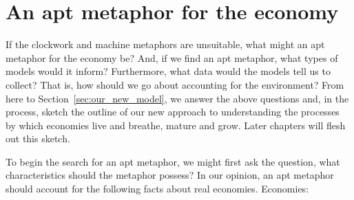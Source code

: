 \section{An apt metaphor for the economy}
\label{sec:apt_metaphor}

If the clockwork and machine metaphors are unsuitable, 
what might an apt metaphor for the economy be?
And, if we find an apt metaphor, what types of models would it inform?
Furthermore, what data would the models tell us to collect?
That is, how should we go about accounting for the environment?
From here to Section~\ref{sec:our_new_model}, we answer the above questions
and, in the process, sketch the outline of our new approach 
to understanding the processes by which economies live and breathe, mature and grow.
Later chapters will flesh out this sketch.

To begin the search for an apt metaphor, 
we might first ask the question, 
what characteristics should the metaphor possess?
In our opinion, an apt metaphor should account for the following facts 
about real economies. 
Economies:

